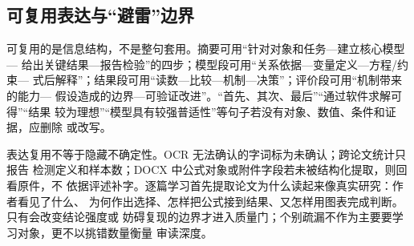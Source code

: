 \subsection{可复用表达与“避雷”边界}

可复用的是信息结构，不是整句套用。摘要可用“针对对象和任务—建立核心模型—
给出关键结果—报告检验”的四步；模型段可用“关系依据—变量定义—方程/约束—
式后解释”；结果段可用“读数—比较—机制—决策”；评价段可用“机制带来的能力—
假设造成的边界—可验证改进”。“首先、其次、最后”“通过软件求解可得”“结果
较为理想”“模型具有较强普适性”等句子若没有对象、数值、条件和证据，应删除
或改写。

表达复用不等于隐藏不确定性。OCR 无法确认的字词标为未确认；跨论文统计只报告
检测定义和样本数；DOCX 中公式对象或附件字段若未被结构化提取，则回看原件，不
依据评述补字。逐篇学习首先提取论文为什么读起来像真实研究：作者看见了什么、
为何作出选择、怎样把公式接到结果、又怎样用图表完成判断。只有会改变结论强度或
妨碍复现的边界才进入质量门；个别疏漏不作为主要要学习对象，更不以挑错数量衡量
审读深度。

